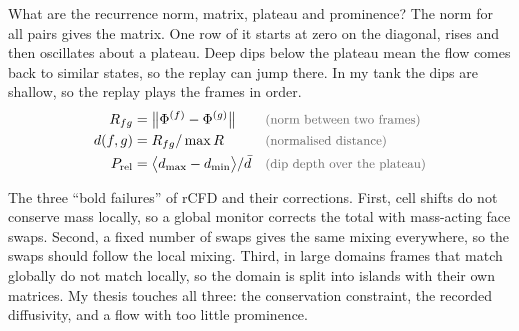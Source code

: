 \begin{qabox}{What are the recurrence norm, matrix, plateau and prominence?}
\explain The norm for all pairs gives the matrix. One row of it starts at zero on the diagonal,
rises and then oscillates about a plateau. Deep dips below the plateau mean the flow comes back to
similar states, so the replay can jump there. In my tank the dips are shallow, so the replay plays
the frames in order.
\derive
\begin{align*}
R_{fg} &= \bigl\lVert\Phi^{(f)} - \Phi^{(g)}\bigr\rVert \why{norm between two frames} \\
d(f,g) &= R_{fg}/\max R \why{normalised distance} \\
P_{\mathrm{rel}} &= \bigl\langle d_{\max} - d_{\min}\bigr\rangle / \bar{d} \why{dip depth over the plateau}
\end{align*}
\end{qabox}

\begin{qabox}{The three ``bold failures'' of rCFD and their corrections.}
\explain First, cell shifts do not conserve mass locally, so a global monitor corrects the total
with mass-acting face swaps. Second, a fixed number of swaps gives the same mixing everywhere, so
the swaps should follow the local mixing. Third, in large domains frames that match globally do not
match locally, so the domain is split into islands with their own matrices. My thesis touches all
three: the conservation constraint, the recorded diffusivity, and a flow with too little
prominence.
\end{qabox}

